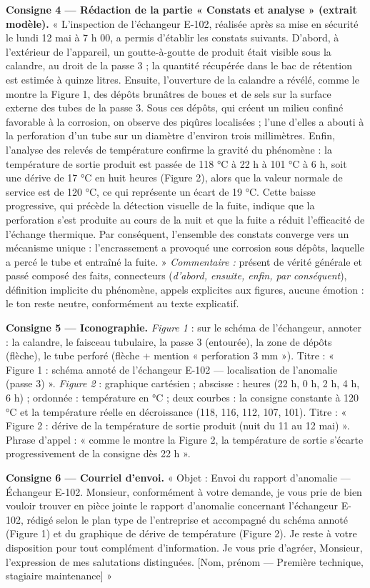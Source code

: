 \documentclass[11pt]{article}
\begin{document}
\begin{exoresolu}
\textbf{Consigne 4 — Rédaction de la partie « Constats et analyse » (extrait modèle).}
« L'inspection de l'échangeur E-102, réalisée après sa mise en sécurité le lundi 12 mai à 7 h 00, a permis d'établir les constats suivants. D'abord, à l'extérieur de l'appareil, un goutte-à-goutte de produit était visible sous la calandre, au droit de la passe 3 ; la quantité récupérée dans le bac de rétention est estimée à quinze litres. Ensuite, l'ouverture de la calandre a révélé, comme le montre la Figure 1, des dépôts brunâtres de boues et de sels sur la surface externe des tubes de la passe 3. Sous ces dépôts, qui créent un milieu confiné favorable à la corrosion, on observe des piqûres localisées ; l'une d'elles a abouti à la perforation d'un tube sur un diamètre d'environ trois millimètres. Enfin, l'analyse des relevés de température confirme la gravité du phénomène : la température de sortie produit est passée de 118 °C à 22 h à 101 °C à 6 h, soit une dérive de 17 °C en huit heures (Figure 2), alors que la valeur normale de service est de 120 °C, ce qui représente un écart de 19 °C. Cette baisse progressive, qui précède la détection visuelle de la fuite, indique que la perforation s'est produite au cours de la nuit et que la fuite a réduit l'efficacité de l'échange thermique. Par conséquent, l'ensemble des constats converge vers un mécanisme unique : l'encrassement a provoqué une corrosion sous dépôts, laquelle a percé le tube et entraîné la fuite. »
\emph{Commentaire :} présent de vérité générale et passé composé des faits, connecteurs (\emph{d'abord, ensuite, enfin, par conséquent}), définition implicite du phénomène, appels explicites aux figures, aucune émotion : le ton reste neutre, conformément au texte explicatif.

\textbf{Consigne 5 — Iconographie.}
\emph{Figure 1} : sur le schéma de l'échangeur, annoter : la calandre, le faisceau tubulaire, la passe 3 (entourée), la zone de dépôts (flèche), le tube perforé (flèche + mention « perforation 3 mm »). Titre : « Figure 1 : schéma annoté de l'échangeur E-102 — localisation de l'anomalie (passe 3) ».
\emph{Figure 2} : graphique cartésien ; abscisse : heures (22 h, 0 h, 2 h, 4 h, 6 h) ; ordonnée : température en °C ; deux courbes : la consigne constante à 120 °C et la température réelle en décroissance (118, 116, 112, 107, 101). Titre : « Figure 2 : dérive de la température de sortie produit (nuit du 11 au 12 mai) ». Phrase d'appel : « comme le montre la Figure 2, la température de sortie s'écarte progressivement de la consigne dès 22 h ».

\textbf{Consigne 6 — Courriel d'envoi.}
« Objet : Envoi du rapport d'anomalie — Échangeur E-102. Monsieur, conformément à votre demande, je vous prie de bien vouloir trouver en pièce jointe le rapport d'anomalie concernant l'échangeur E-102, rédigé selon le plan type de l'entreprise et accompagné du schéma annoté (Figure 1) et du graphique de dérive de température (Figure 2). Je reste à votre disposition pour tout complément d'information. Je vous prie d'agréer, Monsieur, l'expression de mes salutations distinguées. [Nom, prénom — Première technique, stagiaire maintenance] »
\end{exoresolu}
\end{document}
